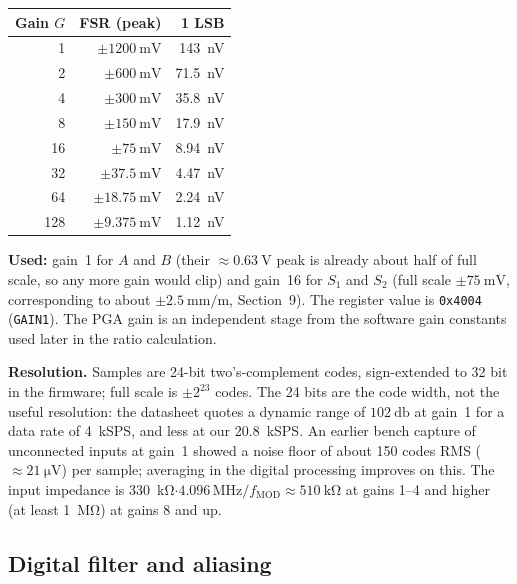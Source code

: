 \documentclass[11pt,a4paper]{article}
\begin{document}
\begin{center}
\small
\begin{tabular}{@{}rrr@{}}
\toprule
Gain $G$ & FSR (peak) & 1 LSB \\
\midrule
1   & $\pm\SI{1200}{\milli\volt}$  & \SI{143}{\nano\volt} \\
2   & $\pm\SI{600}{\milli\volt}$   & \SI{71.5}{\nano\volt} \\
4   & $\pm\SI{300}{\milli\volt}$   & \SI{35.8}{\nano\volt} \\
8   & $\pm\SI{150}{\milli\volt}$   & \SI{17.9}{\nano\volt} \\
16  & $\pm\SI{75}{\milli\volt}$    & \SI{8.94}{\nano\volt} \\
32  & $\pm\SI{37.5}{\milli\volt}$  & \SI{4.47}{\nano\volt} \\
64  & $\pm\SI{18.75}{\milli\volt}$ & \SI{2.24}{\nano\volt} \\
128 & $\pm\SI{9.375}{\milli\volt}$ & \SI{1.12}{\nano\volt} \\
\bottomrule
\end{tabular}
\end{center}

\textbf{Used:} gain~1 for $A$ and $B$ (their $\approx\SI{0.63}{\volt}$ peak is
already about half of full scale, so any more gain would clip) and gain~16
for $S_1$ and $S_2$ (full scale $\pm\SI{75}{\milli\volt}$, corresponding to
about $\pm\SI{2.5}{\milli\metre\per\metre}$, Section~9).  The register value
is \texttt{0x4004} (\texttt{GAIN1}).  The PGA gain is an independent stage
from the software gain constants used later in the ratio calculation.

\textbf{Resolution.}  Samples are 24-bit two's-complement codes, sign-extended
to 32 bit in the firmware; full scale is $\pm2^{23}$ codes.  The 24 bits are
the code width, not the useful resolution: the datasheet quotes a dynamic
range of $\SI{102}{\decibel}$ at gain~1 for a data rate of
\SI{4}{\kilo SPS}, and less at our \SI{20.8}{\kilo SPS}.  An earlier bench
capture of unconnected inputs at gain~1 showed a noise floor of about 150
codes RMS ($\approx\SI{21}{\micro\volt}$) per sample; averaging in the
digital processing improves on this.  The input impedance is
\SI{330}{\kilo\ohm}$\cdot 4.096\,\mathrm{MHz}/f_{\mathrm{MOD}}
\approx\SI{510}{\kilo\ohm}$ at gains 1--4 and higher (at least
\SI{1}{\mega\ohm}) at gains 8 and up.

\subsection{Digital filter and aliasing}
\end{document}
